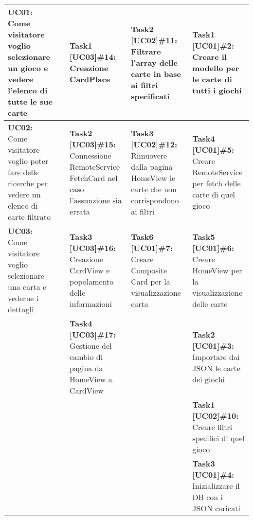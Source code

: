 \documentclass{article}
\begin{document}
\begin{itemize}
\begin{tabular}{ | p{2.4cm} | p{1.4cm} | p{2.7cm} | p{3.4cm} | p{3cm} | }
            \hline
            \textbf{UC01:} Come visitatore voglio selezionare un gioco e vedere l'elenco di tutte le sue carte
            & & \textbf{Task1 [UC03]\#14:} Creazione CardPlace
            & \textbf{Task2 [UC02]\#11:} Filtrare l'array delle carte in base ai filtri specificati
            & \textbf{Task1 [UC01]\#2:} Creare il modello per le carte di tutti i giochi \\
            \hline
            \textbf{UC02:} Come visitatore voglio poter fare delle ricerche per vedere un elenco di carte filtrato
            & & \textbf{Task2 [UC03]\#15:} Connessione RemoteService FetchCard nel caso l'assunzione sia errata
            & \textbf{Task3 [UC02]\#12:} Rimuovere dalla pagina HomeView le carte che non corrispondono ai filtri
            & \textbf{Task4 [UC01]\#5:} Creare RemoteService per fetch delle carte di quel gioco \\
            \hline
            \textbf{UC03:} Come visitatore voglio selezionare una carta e vederne i dettagli
            & & \textbf{Task3 [UC03]\#16:} Creazione CardView e popolamento delle informazioni
            & \textbf{Task6 [UC01]\#7:} Creare Composite Card per la visualizzazione carta
            & \textbf{Task5 [UC01]\#6:} Creare HomeView per la visualizzazione delle carte \\
            \hline
            & & \textbf{Task4 [UC03]\#17:} Gestione del cambio di pagina da HomeView a CardView
            & & \textbf{Task2 [UC01]\#3:} Importare dai JSON le carte dei giochi \\
            \hline
            & & & & \textbf{Task1 [UC02]\#10:} Creare filtri specifici di quel gioco  \\
            \hline
            & & & & \textbf{Task3 [UC01]\#4:} Inizializzare il DB con i JSON caricati \\
            \hline
        \end{tabular}
    \end{itemize}
\end{document}
